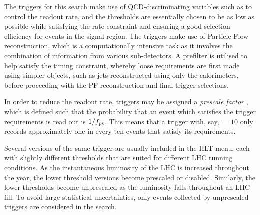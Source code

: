 The triggers for this search make use of QCD-discriminating variables such as 
\alphat to control the readout rate, and the thresholds are essentially chosen 
to be as low as possible while satisfying the rate constraint and ensuring a 
good selection efficiency for events in the signal region.
The triggers make use of Particle Flow reconstruction, which is a 
computationally intensive task as it involves the combination of information 
from various sub-detectors. A prefilter is utilised to help satisfy the timing 
constraint, whereby loose 
requirements are first made using simpler objects, such as jets reconstructed 
using only the calorimeters, before proceeding with the PF reconstruction and 
final trigger selections.

In order to reduce the readout rate, triggers may be assigned a 
\textit{prescale factor} \prescale, which is defined such that the probability 
that an event which satisfies the trigger requirements is read out is 
$1/f_{\text{ps}}$. This means that a trigger with, say, \prescale$=10$ only records 
approximately one in every ten events that satisfy its requirements.

Several versions of the same trigger are usually included in the HLT menu, each 
with slightly different thresholds that are suited for different LHC running 
conditions. As the instantaneous luminosity of the LHC is increased throughout 
the year, the lower threshold versions become prescaled or 
disabled. Similarly, the lower thresholds become unprescaled as the luminosity 
falls throughout an LHC fill. To avoid large statistical uncertainties, only 
events collected by unprescaled triggers are considered in the search.

